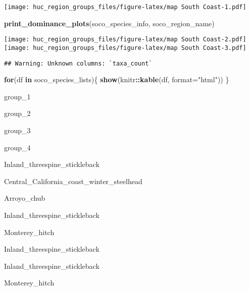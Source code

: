 \documentclass[]{article}
\newenvironment{Shaded}{\begin{snugshade}}{\end{snugshade}}
\newcommand{\KeywordTok}[1]{\textcolor[rgb]{0.13,0.29,0.53}{\textbf{#1}}}
\newcommand{\DataTypeTok}[1]{\textcolor[rgb]{0.13,0.29,0.53}{#1}}
\newcommand{\StringTok}[1]{\textcolor[rgb]{0.31,0.60,0.02}{#1}}
\newcommand{\CommentTok}[1]{\textcolor[rgb]{0.56,0.35,0.01}{\textit{#1}}}
\newcommand{\ControlFlowTok}[1]{\textcolor[rgb]{0.13,0.29,0.53}{\textbf{#1}}}
\newcommand{\OperatorTok}[1]{\textcolor[rgb]{0.81,0.36,0.00}{\textbf{#1}}}
\newcommand{\NormalTok}[1]{#1}
\begin{document}
\texttt{[image: huc\_region\_groups\_files/figure-latex/map South Coast-1.pdf]}

\begin{Shaded}
\begin{Highlighting}[]
\KeywordTok{print_dominance_plots}\NormalTok{(soco_species_info, soco_region_name)}
\end{Highlighting}
\end{Shaded}

\texttt{[image: huc\_region\_groups\_files/figure-latex/map South Coast-2.pdf]}
\texttt{[image: huc\_region\_groups\_files/figure-latex/map South Coast-3.pdf]}

\begin{Shaded}
\end{Shaded}

\begin{verbatim}
## Warning: Unknown columns: `taxa_count`
\end{verbatim}

\begin{Shaded}
\begin{Highlighting}[]
\ControlFlowTok{for}\NormalTok{(df }\ControlFlowTok{in}\NormalTok{ soco_species_lists)\{}
  \KeywordTok{show}\NormalTok{(knitr}\OperatorTok{::}\KeywordTok{kable}\NormalTok{(df, }\DataTypeTok{format=}\StringTok{"html"}\NormalTok{))}
\NormalTok{\}}
\end{Highlighting}
\end{Shaded}

group\_1

group\_2

group\_3

group\_4

Inland\_threespine\_stickleback

Central\_California\_coast\_winter\_steelhead

Arroyo\_chub

Inland\_threespine\_stickleback

Monterey\_hitch

Inland\_threespine\_stickleback

Inland\_threespine\_stickleback

Monterey\_hitch
\end{document}
